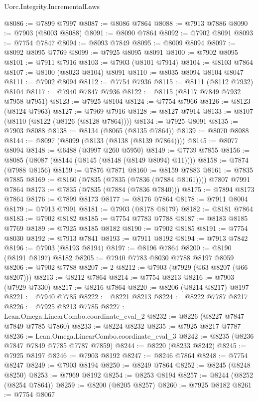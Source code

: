 \begin{lexlean}{Uorc.Integrity.IncrementalLaws}
\begin{coremodule}
@8086 := @7899 @7997
@8087 := @8086 @7864
@8088 := @7913 @7886
@8090 := @7903 (@8003 @8088)
@8091 := @8090 @7864
@8092 := @7902 @8091
@8093 := @7754 @7847
@8094 := @8093 @7849
@8095 := @8009 @8094
@8097 := @8092 @8095 @7769
@8099 := @7925 @8095 @8091
@8100 := @7902 @8095
@8101 := @7911 @7916
@8103 := @7903 (@8101 @7914)
@8104 := @8103 @7864
@8107 := @8100 (@8023 @8104) @8091
@8110 := @8035 @8094 @8104 @8047
@8111 := @7902 @8094
@8112 := @7754 @7936
@8115 := @8111 (@8112 @7932) @8104
@8117 := @7940 @7847 @7936
@8122 := @8115 (@8117 @7849 @7932 @7958 @7951)
@8123 := @7925 @8104
@8124 := @7754 @7966
@8126 := @8123 (@8124 @7963)
@8127 := @7969 @7916
@8128 := @8127 @7914
@8133 := @8107 (@8110 (@8122 (@8126 (@8128 @7864))))
@8134 := @7925 @8091
@8135 := @7903 @8088
@8138 := @8134 (@8065 (@8135 @7864))
@8139 := @8070 @8088
@8144 := @8097 (@8099 (@8133 (@8138 (@8139 @7864))))
@8145 := @8077 @8094
@8148 := @6488 (@3997 @260 @5950)
@8149 := @7739 @7855
@8156 := @8085 (@8087 (@8144 (@8145 (@8148 (@8149 @8094) @11))))
@8158 := @7874 (@7988 @8156)
@8159 := @7876 @7871
@8160 := @8159 @7883
@8161 := @7835 @7885
@8169 := @8160 (@7835 (@7835 (@7836 (@7884 @8161)))) @7807 @7991 @7864
@8173 := @7835 (@7835 (@7884 (@7836 @7840)))
@8175 := @7894 @8173 @7864
@8176 := @7899 @8173
@8177 := @8176 @7864
@8178 := @7911 @8004
@8179 := @7913 @7991
@8181 := @7903 (@8178 @8179)
@8182 := @8181 @7864
@8183 := @7902 @8182
@8185 := @7754 @7783 @7788
@8187 := @8183 @8185 @7769
@8189 := @7925 @8185 @8182
@8190 := @7902 @8185
@8191 := @7754 @8030
@8192 := @7913 @7841
@8193 := @7911 @8192
@8194 := @7913 @7842
@8196 := @7903 (@8193 @8194)
@8197 := @8196 @7864
@8200 := @8190 (@8191 @8197) @8182
@8205 := @7940 @7783 @8030 @7788 @8197 @8059
@8206 := @7902 @7788
@8207 := 2
@8212 := @7903 (@7929 (@63 @8207 (@66 @8207)))
@8213 := @8212 @7864
@8214 := @7754 @8213
@8216 := @7903 (@7929 @7330)
@8217 := @8216 @7864
@8220 := @8206 (@8214 @8217) @8197
@8221 := @7940 @7785
@8222 := @8221 @8213
@8224 := @8222 @7787 @8217
@8226 := @7925 @8213 @7785
@8227 := Lean.Omega.LinearCombo.coordinate_eval_2
@8232 := @8226 (@8227 @7847 @7849 @7785 @7860)
@8233 := @8224 @8232
@8235 := @7925 @8217 @7787
@8236 := Lean.Omega.LinearCombo.coordinate_eval_3
@8242 := @8235 (@8236 @7847 @7849 @7785 @7787 @7859)
@8244 := @8220 (@8233 @8242)
@8245 := @7925 @8197
@8246 := @7903 @8192
@8247 := @8246 @7864
@8248 := @7754 @8247
@8249 := @7903 @8194
@8250 := @8249 @7864
@8252 := @8245 (@8248 @8250)
@8253 := @7969 @8192
@8254 := @8253 @8194
@8257 := @8244 (@8252 (@8254 @7864))
@8259 := @8200 (@8205 @8257)
@8260 := @7925 @8182
@8261 := @7754 @8067

\end{coremodule}
\end{lexlean}
